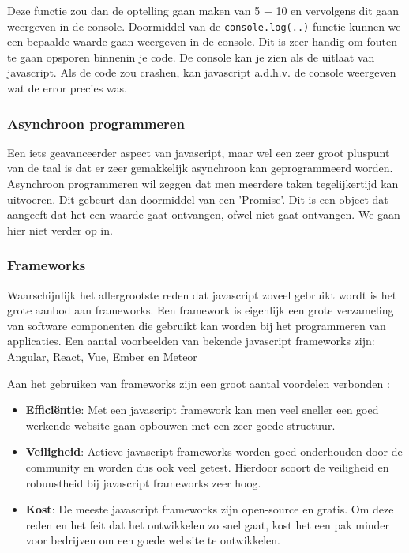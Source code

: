 Deze functie zou dan de optelling gaan maken van 5 + 10 en vervolgens dit gaan weergeven in de console. Doormiddel van de \lstinline[basicstyle=\ttfamily\color{red}]|console.log(..)| functie kunnen we een bepaalde waarde gaan weergeven in de console. Dit is zeer handig om fouten te gaan opsporen binnenin je code. De console kan je zien als de uitlaat van javascript. Als de code zou crashen, kan javascript a.d.h.v. de console weergeven wat de error precies was.

\subsubsection{Asynchroon programmeren}
\label{sssec:asynchroon-programmeren}
Een iets geavanceerder aspect van javascript, maar wel een zeer groot pluspunt van de taal is dat er zeer gemakkelijk asynchroon kan geprogrammeerd worden. Asynchroon programmeren wil zeggen dat men meerdere taken tegelijkertijd kan uitvoeren. Dit gebeurt dan doormiddel van een 'Promise'. Dit is een object dat aangeeft dat het een waarde gaat ontvangen, ofwel niet gaat ontvangen. We gaan hier niet verder op in.

\subsubsection{Frameworks}
\label{sssec:frameworks}
Waarschijnlijk het allergrootste reden dat javascript zoveel gebruikt wordt is het grote aanbod aan frameworks. Een framework is eigenlijk een grote verzameling van software componenten die gebruikt kan worden bij het programmeren van applicaties. Een aantal voorbeelden van bekende javascript frameworks zijn: Angular, React, Vue, Ember en Meteor

Aan het gebruiken van frameworks zijn een groot aantal voordelen verbonden \autocite{Korotya2018}:

\begin{itemize}
	\item \textbf{Efficiëntie}: Met een javascript framework kan men veel sneller een goed werkende website gaan opbouwen met een zeer goede structuur.
	\item \textbf{Veiligheid}: Actieve javascript frameworks worden goed onderhouden door de community en worden dus ook veel getest. Hierdoor scoort de veiligheid en robuustheid bij javascript frameworks zeer hoog.
	\item \textbf{Kost}: De meeste javascript frameworks zijn open-source en gratis. Om deze reden en het feit dat het ontwikkelen zo snel gaat, kost het een pak minder voor bedrijven om een goede website te ontwikkelen.
\end{itemize}

